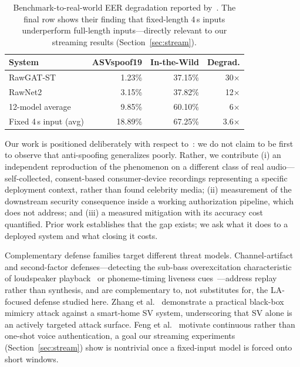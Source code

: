 \documentclass[conference]{IEEEtran}
\begin{document}
\begin{table}[t]
\caption{Benchmark-to-real-world EER degradation reported
by~\cite{muller2022generalize}. The final row shows their finding that
fixed-length 4\,s inputs underperform full-length inputs---directly relevant to
our streaming results (Section~\ref{sec:stream}).}
\label{tab:gap}
\centering
\footnotesize
\begin{tabular}{@{}lrrr@{}}
\toprule
\textbf{System} & \textbf{ASVspoof19} & \textbf{In-the-Wild} & \textbf{Degrad.}\\
\midrule
RawGAT-ST              & 1.23\%  & 37.15\% & 30$\times$\\
RawNet2                & 3.15\%  & 37.82\% & 12$\times$\\
12-model average       & 9.85\%  & 60.10\% & 6$\times$\\
Fixed 4\,s input (avg) & 18.89\% & 67.25\% & 3.6$\times$\\
\bottomrule
\end{tabular}
\end{table}

Our work is positioned deliberately with respect
to~\cite{muller2022generalize}: we do not claim to be first to observe that
anti-spoofing generalizes poorly. Rather, we contribute (i) an independent
reproduction of the phenomenon on a different class of real audio---%
self-collected, consent-based consumer-device recordings representing a
specific deployment context, rather than found celebrity media; (ii)
measurement of the downstream security consequence inside a working
authorization pipeline, which~\cite{muller2022generalize} does not address; and
(iii) a measured mitigation with its accuracy cost quantified. Prior work
establishes that the gap exists; we ask what it does to a deployed system and
what closing it costs.

Complementary defense families target different threat models. Channel-artifact
and second-factor defenses---detecting the sub-bass overexcitation
characteristic of loudspeaker playback~\cite{blue2018hello} or phoneme-timing
liveness cues~\cite{zhang2016voicelive}---address replay rather than synthesis,
and are complementary to, not substitutes for, the LA-focused defense studied
here. Zhang et al.~\cite{zhang2020mimicry} demonstrate a practical black-box
mimicry attack against a smart-home SV system, underscoring that SV alone is an
actively targeted attack surface. Feng et al.~\cite{feng2017continuous}
motivate continuous rather than one-shot voice authentication, a goal our
streaming experiments (Section~\ref{sec:stream}) show is nontrivial once a
fixed-input model is forced onto short windows.
\end{document}
